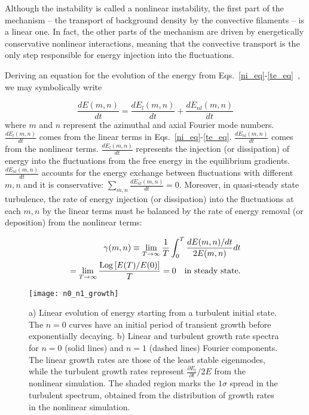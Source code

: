 \documentclass[letter,scriptaddress,twocolumn, prl,showkeys]{revtex4}
\def\beq{\begin{equation}}
\def\eeq{\end{equation}}
\def\beqar{\begin{eqnarray}}
\def\eeqar{\end{eqnarray}}
\newcommand{\diff}[2]{\frac{d#1}{d#2}}
\newcommand{\pdiff}[2]{\frac{\partial#1}{\partial#2}}
\begin{document}
Although the instability is called a nonlinear instability, the first part of the mechanism -- the transport of background density by the convective filaments -- is a linear one.
In fact, the other parts of the mechanism are driven by energetically conservative nonlinear interactions, 
meaning that the convective transport is the only step responsible for energy injection into the fluctuations.

Deriving an equation for the evolution of the energy from Eqs.~\ref{ni_eq}-\ref{te_eq}~\cite{friedman2012b,friedman2013}, we may symbolically write

\beq
\label{dEdt_def}
\diff{E(m,n)}{t} = \diff{E_{l}(m,n)}{t} + \diff{E_{nl}(m,n)}{t}
\eeq
where $m$ and $n$ represent the azimuthal and axial Fourier mode numbers. 
$\diff{E_{l}(m,n)}{t}$ comes from the linear terms in Eqs.~\ref{ni_eq}-\ref{te_eq}. $\diff{E_{nl}(m,n)}{t}$ comes from the nonlinear terms. 
$\diff{E_{l}(m,n)}{t}$ represents the injection (or dissipation) of energy into the fluctuations from the free energy in the equilibrium gradients.
$\diff{E_{nl}(m,n)}{t}$ accounts for the energy exchange between fluctuations with different $m,n$ and it is conservative: $\sum_{m,n} \diff{E_{nl}(m,n)}{t} = 0$.
Moreover, in quasi-steady state turbulence, the rate of energy injection (or dissipation) into the fluctuations at each $m,n$ by the linear terms must be balanced by
the rate of energy removal (or deposition) from the nonlinear terms:

\beqar
\label{steady_state}
\gamma(m,n) \equiv  \displaystyle\lim_{T \to \infty} \frac{1}{T} \int_0^T \frac{dE(m,n)/dt}{2 E(m,n)} dt \nonumber \\
= \displaystyle\lim_{T \to \infty} \frac{{\rm{Log}}\left[ E(T)/E(0) \right]}{T} = 0 \quad {\rm{in \ steady \ state}}.
\eeqar

\begin{figure}
\centerline{\texttt{[image: n0\_n1\_growth]}}
\caption{a) Linear evolution of energy starting from a turbulent initial state. The $n=0$ curves have an initial period of transient growth before exponentially decaying.
b) Linear and turbulent growth rate spectra for $n=0$ (solid lines) and $n=1$ (dashed lines) Fourier components. The linear growth rates are those of the least stable eigenmodes,
while the turbulent growth rates represent $\pdiff{E_l}{t}/2 E$ from the nonlinear simulation. The shaded region marks the $1 \sigma$ spread in the turbulent spectrum,
obtained from the distribution of growth rates in the nonlinear simulation.}
\label{n0_n1_growth}
\end{figure}
\end{document}
